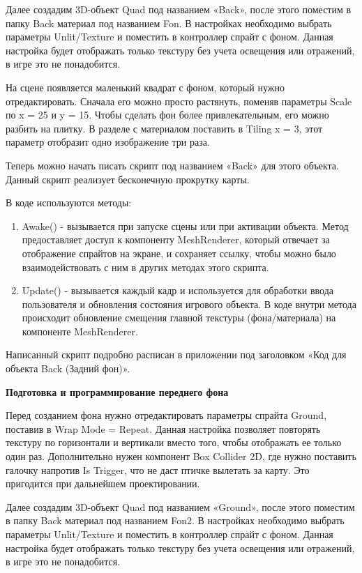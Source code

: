 \documentclass[14pt, oneside]{altsu-report}
\begin{document}
Далее создадим 3D-объект Quad под названием «Back», после этого поместим в папку Back материал под названием Fon. В настройках необходимо выбрать параметры Unlit/Texture и поместить в контроллер спрайт с фоном. Данная настройка будет отображать только текстуру без учета освещения или отражений, в игре это не понадобится. 

На сцене появляется маленький квадрат с фоном, который нужно отредактировать. Сначала его можно просто растянуть, поменяв параметры Scale по x = 25 и y = 15. Чтобы сделать фон более привлекательным, его можно разбить на плитку. В разделе с материалом поставить в Tiling x = 3, этот параметр отобразит одно изображение три раза.  

Теперь можно начать писать скрипт под названием «Back» для этого объекта. Данный скрипт реализует бесконечную прокрутку карты. 

В коде используются методы:

\begin{enumerate}
\item Awake() - вызывается при запуске сцены или при активации объекта. Метод предоставляет доступ к компоненту MeshRenderer, который отвечает за отображение спрайтов на экране, и сохраняет ссылку, чтобы можно было взаимодействовать с ним в других методах этого скрипта.
\item Update() - вызывается каждый кадр и используется для обработки ввода пользователя и обновления состояния игрового объекта. В коде внутри метода происходит обновление смещения главной текстуры (фона/материала) на компоненте MeshRenderer.
\end{enumerate} 

Написанный скрипт подробно расписан в приложении под заголовком «Код для объекта Back (Задний фон)».

\textbf{Подготовка и программирование переднего фона}

Перед созданием фона нужно отредактировать параметры спрайта Ground, поставив в Wrap Mode = Repeat. Данная настройка позволяет повторять текстуру по горизонтали и вертикали вместо того, чтобы отображать ее только один раз. Дополнительно нужен компонент Box Collider 2D, где нужно поставить галочку напротив Is Trigger, что не даст птичке вылетать за карту. Это пригодится при дальнейшем проектировании.

Далее создадим 3D-объект Quad под названием «Ground», после этого поместим в папку Back материал под названием Fon2. В настройках необходимо выбрать параметры Unlit/Texture и поместить в контроллер спрайт с фоном. Данная настройка будет отображать только текстуру без учета освещения или отражений, в игре это не понадобится. 
\end{document}
